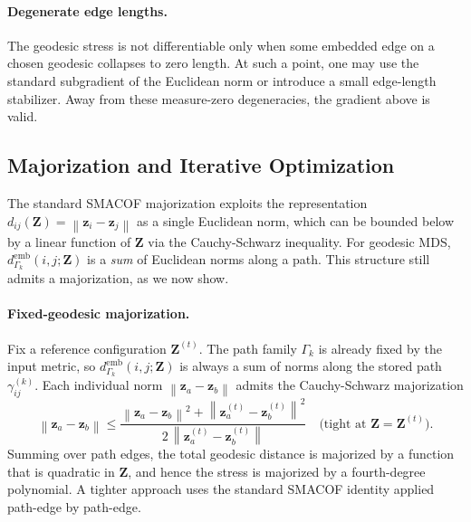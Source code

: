\documentclass[twoside,11pt]{article}
\newcommand{\bz}{\mathbf{z}}
\newcommand{\bZ}{\mathbf{Z}}
\newcommand{\norm}[1]{\left\|#1\right\|}
\newcommand{\demb}{d^{\mathrm{emb}}}
\begin{document}
\paragraph{Degenerate edge lengths.}
The geodesic stress is not differentiable only when some embedded edge on
a chosen geodesic collapses to zero length.  At such a point, one may use
the standard subgradient of the Euclidean norm or introduce a small
edge-length stabilizer.  Away from these measure-zero degeneracies, the
gradient above is valid.

\subsection{Majorization and Iterative Optimization}
\label{sec:geo_smacof}

The standard SMACOF majorization exploits the representation
$d_{ij}(\bZ) = \norm{\bz_i - \bz_j}$ as a single Euclidean norm, which
can be bounded below by a linear function of $\bZ$ via the Cauchy-Schwarz
inequality.  For geodesic MDS, $\demb_{\Gamma_k}(i,j;\bZ)$ is a \emph{sum} of
Euclidean norms along a path.  This structure still admits a majorization,
as we now show.

\paragraph{Fixed-geodesic majorization.}
Fix a reference configuration $\bZ^{(t)}$.  The path family $\Gamma_k$ is
already fixed by the input metric, so $\demb_{\Gamma_k}(i,j;\bZ)$ is always a sum
of norms along the stored path $\gamma_{ij}^{(k)}$.  Each
individual norm $\norm{\bz_a - \bz_b}$ admits the Cauchy-Schwarz majorization
\begin{equation}
  \norm{\bz_a - \bz_b}
  \leq
  \frac{\norm{\bz_a - \bz_b}^2 + \norm{\bz^{(t)}_a - \bz^{(t)}_b}^2}
       {2\,\norm{\bz^{(t)}_a - \bz^{(t)}_b}}
  \quad \text{(tight at } \bZ = \bZ^{(t)}\text{)}.
  \label{eq:cs_majorization}
\end{equation}
Summing over path edges, the total geodesic distance is majorized by a
function that is quadratic in $\bZ$, and hence the stress is majorized by
a fourth-degree polynomial.  A tighter approach uses the standard SMACOF
identity applied path-edge by path-edge.
\end{document}
